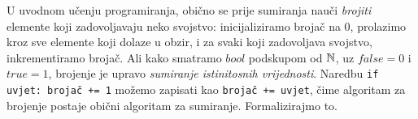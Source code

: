 





U uvodnom učenju programiranja, obično se prije sumiranja nauči \emph{brojiti} elemente koji zadovoljavaju neko svojstvo: inicijaliziramo brojač na $0$, prolazimo kroz sve elemente koji dolaze u obzir, i za svaki koji zadovoljava svojstvo, inkrementiramo brojač. Ali kako smatramo $bool$ podskupom od ${\mathbb N}$, uz $\mathit{false}=0$ i $\mathit{true}=1$, brojenje je upravo \emph{sumiranje istinitosnih vrijednosti}. Naredbu \texttt{if uvjet:\ brojač += 1} možemo zapisati kao \texttt{brojač += uvjet}, čime algoritam za brojenje postaje obični algoritam za sumiranje. Formalizirajmo to.

